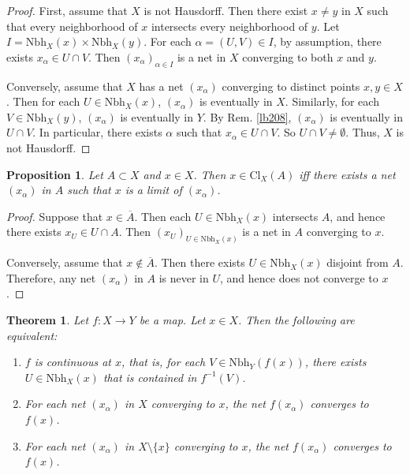 \documentclass[12pt,b5paper,notitlepage]{article}
\theoremstyle{definition}
\theoremstyle{plain}
\newtheorem{thm}[df]{Theorem}
\newtheorem{pp}[df]{Proposition}
\newcommand{\ovl}{\overline}
\newcommand{\Nbh}{\mathrm{Nbh}}
\newcommand{\Cl}{\mathrm{Cl}}
\numberwithin{equation}{section}
\begin{document}
\begin{proof}
First, assume that $X$ is not Hausdorff. Then there exist $x\neq y$ in $X$ such that every neighborhood of $x$ intersects every neighborhood of $y$. Let $I=\Nbh_X(x)\times\Nbh_X(y)$. For each $\alpha=(U,V)\in I$, by assumption, there exists $x_\alpha\in U\cap V$. Then $(x_\alpha)_{\alpha\in I}$ is a net in $X$ converging to both $x$ and $y$.

Conversely, assume that $X$ has a net $(x_\alpha)$ converging to distinct points $x,y\in X$. Then for each $U\in\Nbh_X(x)$, $(x_\alpha)$ is eventually in $X$. Similarly, for each $V\in\Nbh_X(y)$, $(x_\alpha)$ is eventually in $Y$. By Rem. \ref{lb208}, $(x_\alpha)$ is eventually in $U\cap V$. In particular, there exists $\alpha$ such that $x_\alpha\in U\cap V$. So $U\cap V\neq\emptyset$. Thus, $X$ is not Hausdorff.
\end{proof}


\begin{pp}\label{lb209}
Let $A\subset X$ and $x\in X$. Then $x\in\Cl_X(A)$ iff there exists a net $(x_\alpha)$ in $A$ such that $x$ is a limit of $(x_\alpha)$.
\end{pp}


\begin{proof}
Suppose that $x\in\ovl A$. Then each $U\in\Nbh_X(x)$ intersects $A$, and hence there exists $x_U\in U\cap A$. Then $(x_U)_{U\in\Nbh_X(x)}$ is a net in $A$ converging to $x$.

Conversely, assume that $x\notin\ovl A$. Then there exists $U\in\Nbh_X(x)$ disjoint from $A$. Therefore, any net $(x_\alpha)$ in $A$ is never in $U$, and hence does not converge to $x$.
\end{proof}



\begin{thm}\label{lb210}
Let $f:X\rightarrow Y$ be a map. Let $x\in X$. Then the following are equivalent:
\begin{enumerate}
\item[(1)] $f$ is continuous at $x$, that is, for each $V\in\Nbh_Y(f(x))$, there exists $U\in\Nbh_X(x)$ that is contained in $f^{-1}(V)$.
\item[(2)] For each net $(x_\alpha)$ in $X$ converging to $x$, the net $f(x_\alpha)$ converges to $f(x)$.
\item[(3)] For each net $(x_\alpha)$ in $X\setminus\{x\}$ converging to $x$, the net $f(x_\alpha)$ converges to $f(x)$.
\end{enumerate}
\end{thm}
\end{document}

